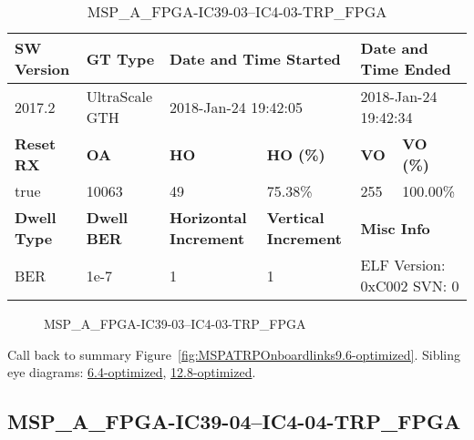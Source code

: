 \begin{table}[h]
\centering
\caption{MSP\_A\_FPGA-IC39-03--IC4-03-TRP\_FPGA}
\label{tab:MSPAFPGAIC3903IC403TRPFPGA9.6-optimized}
\begin{tabular}{@{}|l|l|l|l|l|l|@{}}
\toprule
\textbf{SW Version}                & \textbf{GT Type}   & \multicolumn{2}{l|}{\textbf{Date and Time Started}}            & \multicolumn{2}{l|}{\textbf{Date and Time Ended}}        \\ \midrule
2017.2                       & UltraScale GTH          & \multicolumn{2}{l|}{2018-Jan-24 19:42:05}                   & \multicolumn{2}{l|}{2018-Jan-24 19:42:34}               \\ \midrule
\textbf{Reset RX}                  & \textbf{OA} & \textbf{HO}   & \textbf{HO (\%)} & \textbf{VO} & \textbf{VO (\%)} \\ \midrule
true & 10063        & 49          & 75.38\%        & 255        & 100.00\%       \\ \midrule
\textbf{Dwell Type}                & \textbf{Dwell BER} & \textbf{Horizontal Increment} & \textbf{Vertical Increment}    & \multicolumn{2}{l|}{\textbf{Misc Info}}                  \\ \midrule
BER                            & 1e-7        & 1        & 1           & \multicolumn{2}{l|}{ELF Version: 0xC002 SVN: 0}                         \\ \bottomrule
\end{tabular}
\end{table}

\begin{figure}[h]
\caption{MSP\_A\_FPGA-IC39-03--IC4-03-TRP\_FPGA} \label{fig:MSPAFPGAIC3903IC403TRPFPGA9.6-optimized}
\end{figure}

Call back to summary Figure~\ref{fig:MSPATRPOnboardlinks9.6-optimized}.
Sibling eye diagrams: \hyperref[sec:MSPAFPGAIC3903IC403TRPFPGA6.4-optimized]{6.4-optimized}, \hyperref[sec:MSPAFPGAIC3903IC403TRPFPGA12.8-optimized]{12.8-optimized}.

\clearpage
\newpage


\subsection{MSP\_A\_FPGA-IC39-04--IC4-04-TRP\_FPGA}\label{sec:MSPAFPGAIC3904IC404TRPFPGA9.6-optimized}

